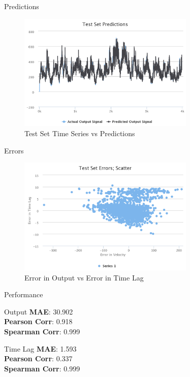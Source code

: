 \documentclass{beamer}
\begin{document}
\begin{frame}{Predictions}
    \begin{figure}[h]
        \includegraphics[width=0.75\textwidth]{predictions-ii.png}
        \caption{Test Set Time Series vs Predictions}
        \label{fig:predictions-ii}
      \end{figure}
\end{frame}

\begin{frame}{Errors}
    \begin{figure}[h]
        \includegraphics[width=0.75\textwidth]{errors-ii.png}
        \caption{Error in Output vs Error in Time Lag}
        \label{fig:errors-ii}
      \end{figure}
\end{frame}

\begin{frame}{Performance}
 
\begin{block}{Output}
\textbf{MAE}: 30.902 \\
\textbf{Pearson Corr}: 0.918 \\
\textbf{Spearman Corr}: 0.999
\end{block}

\begin{block}{Time Lag}
\textbf{MAE}: 1.593 \\
\textbf{Pearson Corr}: 0.337 \\
\textbf{Spearman Corr}: 0.999
\end{block}



\end{frame}
\end{document}
